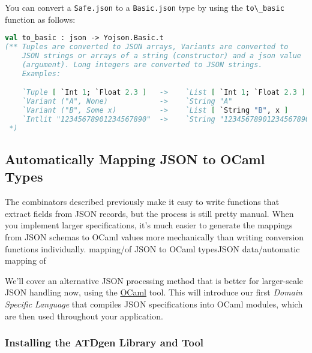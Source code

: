 You can convert a \passthrough{\lstinline!Safe.json!} to a
\passthrough{\lstinline!Basic.json!} type by using the
\passthrough{\lstinline!to\_basic!} function as follows:

\begin{lstlisting}[language=Caml]
val to_basic : json -> Yojson.Basic.t
(** Tuples are converted to JSON arrays, Variants are converted to
    JSON strings or arrays of a string (constructor) and a json value
    (argument). Long integers are converted to JSON strings.
    Examples:

    `Tuple [ `Int 1; `Float 2.3 ]   ->    `List [ `Int 1; `Float 2.3 ]
    `Variant ("A", None)            ->    `String "A"
    `Variant ("B", Some x)          ->    `List [ `String "B", x ]
    `Intlit "12345678901234567890"  ->    `String "12345678901234567890"
 *)
\end{lstlisting}

\hypertarget{automatically-mapping-json-to-ocaml-types}{%
\subsection{Automatically Mapping JSON to OCaml
Types}\label{automatically-mapping-json-to-ocaml-types}}

The combinators described previously make it easy to write functions
that extract fields from JSON records, but the process is still pretty
manual. When you implement larger specifications, it's much easier to
generate the mappings from JSON schemas to OCaml values more
mechanically than writing conversion functions individually.
\protect\hypertarget{MAPjson}{}{mapping/of JSON to OCaml
types}\protect\hypertarget{JSONautomap}{}{JSON data/automatic mapping
of}

We'll cover an alternative JSON processing method that is better for
larger-scale JSON handling now, using the
\href{http://mjambon.com/atd-biniou-intro.html}{OCaml} tool. This will
introduce our first \emph{Domain Specific Language} that compiles JSON
specifications into OCaml modules, which are then used throughout your
application. 

\hypertarget{installing-the-atdgen-library-and-tool}{%
\subsubsection{Installing the ATDgen Library and
Tool}\label{installing-the-atdgen-library-and-tool}}


